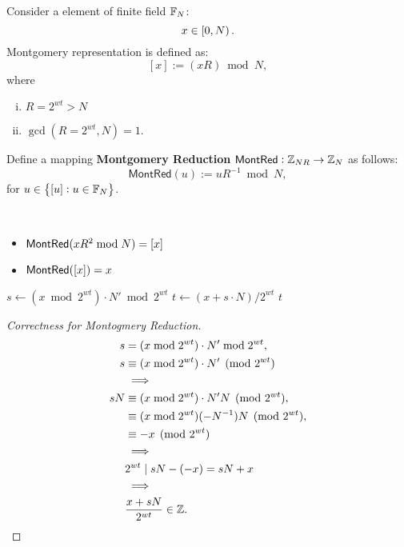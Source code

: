 \begin{tcolorbox}[colframe=defcolor,title={\color{white}\bf Montgomery From}]
\begin{definition}
Consider a element of finite field $\mathbb{F}_N$: \[
x\in\intco{0,N}.
\] Montgomery representation is defined as: \[
[x]:=(xR)\bmod N,
\] where \begin{enumerate}[(i)]
\item $R=2^{wt}>N$
\item $\gcd(R=2^{wt}, N)=1$.
\end{enumerate}
\end{definition}	
\end{tcolorbox}

\begin{tcolorbox}[colframe=defcolor,title={\color{white}\bf Montgomery Reduction}]
\begin{definition}
Define a mapping \textbf{Montgomery Reduction} $\mathsf{MontRed}:\mathbb{Z}_{NR}\to\mathbb{Z}_{N}$ as follows: \[
\mathsf{MontRed}(u):=uR^{-1}\bmod N,
\] for $u\in\set{[u]: u\in \mathbb{F}_N}$.
\end{definition}	
\end{tcolorbox}
\begin{remark}
\ \begin{itemize}
\item $\mathsf{MontRed} (xR^2\bmod N)=[x]$
\item $\mathsf{MontRed} ([x])=x$
\end{itemize}
\end{remark}

\begin{algorithm}[H]
\DontPrintSemicolon
\caption{Montgomery Reduction: $\MontRed(x)=x{2^{wt}}^{-1}\bmod N$}
\BlankLine
{}
\BlankLine
$s\gets(x\bmod {2^{wt}})\cdot N'\bmod {2^{wt}}$
$t\gets(x+s\cdot N) / {2^{wt}}$
 \Return $t$\;
\end{algorithm}
\begin{proof}[Correctness for Montogmery Reduction]
\begin{align*}
s&=(x\bmod {2^{wt}})\cdot N'\bmod {2^{wt}}, \\
s&\equiv(x\bmod {2^{wt}})\cdot N'\pmod {2^{wt}}\\
&\implies\\
sN&\equiv(x\bmod {2^{wt}})\cdot N'N\pmod {2^{wt}}, \\
&\equiv (x\bmod {2^{wt}})(-N^{-1})N\pmod {2^{wt}}, \\
&\equiv -x\pmod{2^{wt}}\\
&\implies\\ 
&2^{wt}\mid sN-(-x)=sN+x\\
&\implies\\ 
&\frac{x+sN}{2^{wt}}\in\mathbb{Z}.
\end{align*}
\end{proof}

